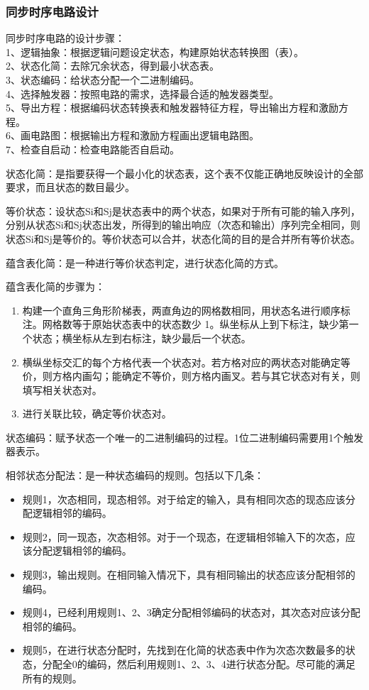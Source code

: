 \documentclass{article}
\begin{document}
	\subsubsection{同步时序电路设计}
	同步时序电路的设计步骤：\\
	1、逻辑抽象：根据逻辑问题设定状态，构建原始状态转换图（表）。\\
	2、状态化简：去除冗余状态，得到最小状态表。\\
	3、状态编码：给状态分配一个二进制编码。\\
	4、选择触发器：按照电路的需求，选择最合适的触发器类型。\\
	5、导出方程：根据编码状态转换表和触发器特征方程，导出输出方程和激励方程。\\
	6、画电路图：根据输出方程和激励方程画出逻辑电路图。\\
	7、检查自启动：检查电路能否自启动。\par
	状态化简：是指要获得一个最小化的状态表，这个表不仅能正确地反映设计的全部要求，而且状态的数目最少。\par
	等价状态：设状态Si和Sj是状态表中的两个状态，如果对于所有可能的输入序列，分别从状态Si和Sj状态出发，所得到的输出响应（次态和输出）序列完全相同，则状态Si和Sj是等价的。等价状态可以合并，状态化简的目的是合并所有等价状态。\par 
	蕴含表化简：是一种进行等价状态判定，进行状态化简的方式。\par
	蕴含表化简的步骤为：
	\begin{enumerate}
		\item 构建一个直角三角形阶梯表，两直角边的网格数相同，用状态名进行顺序标注。网格数等于原始状态表中的状态数少 1。纵坐标从上到下标注，缺少第一个状态；横坐标从左到右标注，缺少最后一个状态。
		\item 横纵坐标交汇的每个方格代表一个状态对。若方格对应的两状态对能确定等价，则方格内画勾；能确定不等价，则方格内画叉。若与其它状态对有关，则填写相关状态对。
		\item 进行关联比较，确定等价状态对。
	\end{enumerate}	
	状态编码：赋予状态一个唯一的二进制编码的过程。1位二进制编码需要用1个触发器表示。
	
	相邻状态分配法：是一种状态编码的规则。包括以下几条：
	\begin{itemize}		
		\item 规则1，次态相同，现态相邻。对于给定的输入，具有相同次态的现态应该分配逻辑相邻的编码。
		\item 规则2，同一现态，次态相邻。对于一个现态，在逻辑相邻输入下的次态，应该分配逻辑相邻的编码。
		\item 规则3，输出规则。在相同输入情况下，具有相同输出的状态应该分配相邻的编码。
		\item 规则4，已经利用规则1、2、3确定分配相邻编码的状态对，其次态对应该分配相邻的编码。
		\item 规则5，在进行状态分配时，先找到在化简的状态表中作为次态次数最多的状态，分配全0的编码，然后利用规则1、2、3、4进行状态分配。尽可能的满足所有的规则。
	\end{itemize}
		
\end{document}
